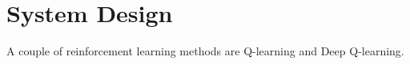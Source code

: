 \documentclass{LTHtwocol} %
\begin{document}
%
%

\section{System Design}
A couple of reinforcement learning methods are Q-learning and Deep Q-learning.
\end{document}
